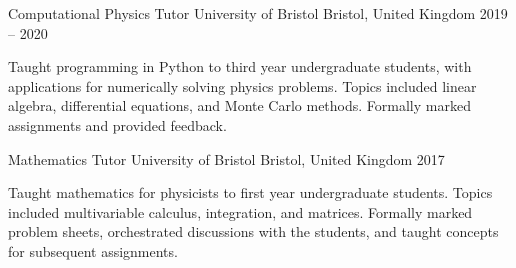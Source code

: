 
\begin{cventries}

    \cventry
      {Computational Physics Tutor} %
      {University of Bristol} %
      {Bristol, United Kingdom} %
      {2019 -- 2020} %
      {
        \begin{cvitems} %
          \item{Taught programming in Python to third year undergraduate students, with applications for numerically solving physics problems. Topics included linear algebra, differential equations, and Monte Carlo methods. Formally marked assignments and provided feedback.}
        \end{cvitems}
      }

    \cventry
      {Mathematics Tutor} %
      {University of Bristol} %
      {Bristol, United Kingdom} %
      {2017} %
      {
        \begin{cvitems} %
          \item{Taught mathematics for physicists to first year undergraduate students. Topics included multivariable calculus, integration, and matrices. Formally marked problem sheets, orchestrated discussions with the students, and taught concepts for subsequent assignments.}
        \end{cvitems}
      }

\end{cventries}
